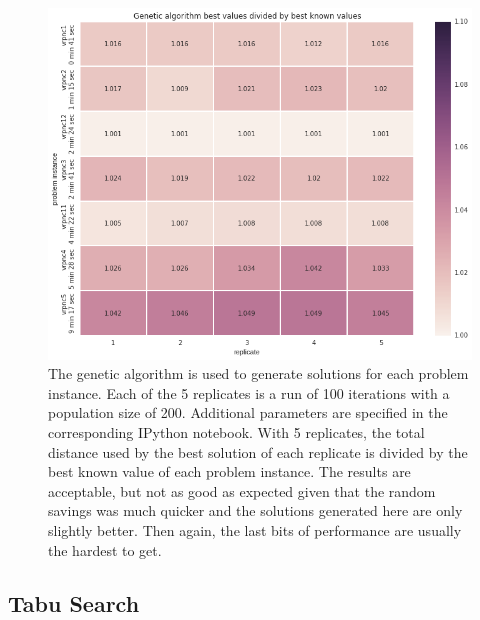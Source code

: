 \documentclass{article} %
\begin{document}
\begin{figure}[!htb]
\begin{center}
 \includegraphics[scale=0.45]{figures/ga_best}
 \caption{\small  The genetic algorithm is used to generate solutions for each problem instance. Each of the 5 replicates is a run of 100 iterations with a population size of 200. Additional parameters are specified in the corresponding IPython notebook. With 5 replicates, the total distance used by the best solution of each replicate is divided by the best known value of each problem instance. The results are acceptable, but not as good as expected given that the random savings was much quicker and the solutions generated here are only slightly better. Then again, the last bits of performance are usually the hardest to get.}
 \label{ga_fig}
 \end{center}
\end{figure}


\newpage
\subsection{Tabu Search}
\end{document}
